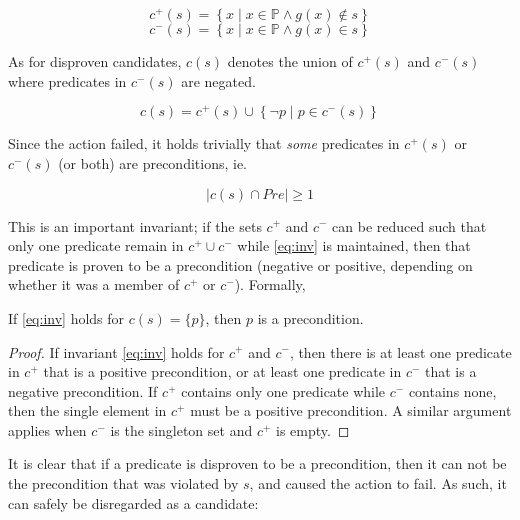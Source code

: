\documentclass[../../Master.tex]{subfiles}
\begin{document}
\begin{equation} \label{eq:cPlus}
    c^+(s) = \left\{ x \; | \; x \in \mathbb{P} \land g(x) \notin s \right\}
\end{equation}
\begin{equation} \label{eq:cMinus}
    c^-(s) = \left\{ x \; | \; x \in \mathbb{P} \land g(x) \in s \right\}
\end{equation}

As for disproven candidates, $c(s)$ denotes the union of $c^+(s)$ and $c^-(s)$ where predicates in $c^-(s)$ are negated.

\begin{equation}
    c(s) = c^+(s) \cup \left\{ \neg p \; | \; p \in c^-(s) \right\}
\end{equation}

Since the action failed, it holds trivially that \textit{some} predicates in $c^+(s)$ or $c^-(s)$ (or both) are preconditions, ie.

\begin{equation} \label{eq:inv}
    \left| c(s) \cap Pre \right| \geq 1
\end{equation}

This is an important invariant; if the sets $c^+$ and $c^-$ can be reduced such that only one predicate remain in $c^+ \cup c^-$ while \eqref{eq:inv} is maintained, then that predicate is proven to be a precondition (negative or positive, depending on whether it was a member of $c^+$ or $c^-$). Formally,

\begin{proposition} \label{prop:ncp:precond-holds}
    If \eqref{eq:inv} holds for $c(s) = \{p\}$, then $p$ is a precondition.
\end{proposition}

\begin{proof}
    If invariant \eqref{eq:inv} holds for $c^+$ and $c^-$, then there is at least one predicate in $c^+$ that is a positive precondition, or at least one predicate in $c^-$ that is a negative precondition. If $c^+$ contains only one predicate while $c^-$ contains none, then the single element in $c^+$ must be a positive precondition. A similar argument applies when $c^-$ is the singleton set and $c^+$ is empty.
\end{proof}

It is clear that if a predicate is disproven to be a precondition, then it can not be the precondition that was violated by $s$, and caused the action to fail. As such, it can safely be disregarded as a candidate:
\end{document}

